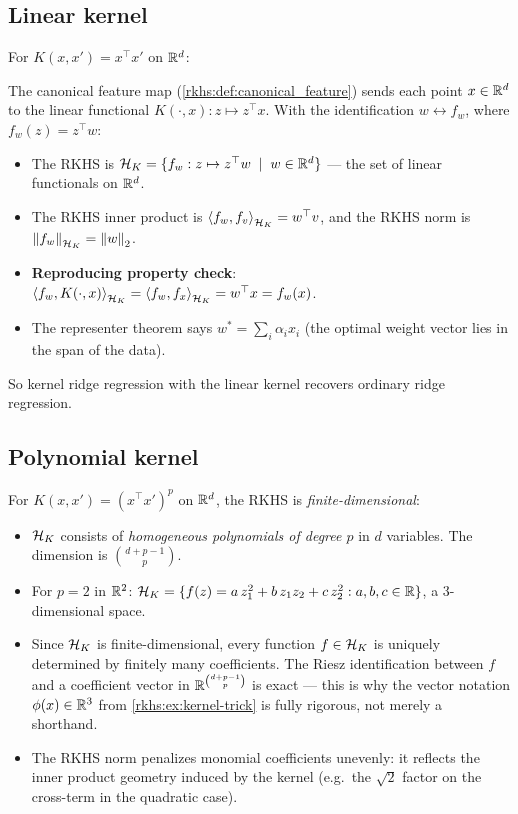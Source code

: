 \begin{notechapter}
\subsection{Linear kernel}

For $K(x,x') = x^\top x'$ on $\mathbb{R}^d$:

The canonical feature map
(\cref{rkhs:def:canonical_feature}) sends each
point $x \in \mathbb{R}^d$ to the linear functional
$K(\cdot, x): z \mapsto z^\top x$. With the
identification $w \leftrightarrow f_w$, where
$f_w(z) = z^\top w$:
\begin{itemize}
  \item The RKHS is
    $\mathcal{H}_K = \{f_w : z \mapsto z^\top w \;\mid\;
    w \in \mathbb{R}^d\}$ --- the set of linear functionals
    on $\mathbb{R}^d$.
  \item The RKHS inner product is
    $\left\langle f_w, f_v \right\rangle_{\mathcal{H}_K} = w^\top v$, and the
    RKHS norm is $\left\|f_w\right\|_{\mathcal{H}_K} = \left\|w\right\|_2$.
  \item \textbf{Reproducing property check}:
    $\left\langle f_w, K(\cdot,x) \right\rangle_{\mathcal{H}_K}
    = \left\langle f_w, f_x \right\rangle_{\mathcal{H}_K} = w^\top x
    = f_w(x)$.
  \item The representer theorem says
    $w^* = \sum_i \alpha_i x_i$ (the optimal weight
    vector lies in the span of the data).
\end{itemize}

So kernel ridge regression with the linear kernel recovers ordinary
ridge regression.

\subsection{Polynomial kernel}

For $K(x,x') = (x^\top x')^p$ on $\mathbb{R}^d$, the RKHS is
\emph{finite-dimensional}:
\begin{itemize}
  \item $\mathcal{H}_K$ consists of \emph{homogeneous polynomials
    of degree $p$} in $d$ variables. The dimension is
    $\binom{d+p-1}{p}$.
  \item For $p = 2$ in $\mathbb{R}^2$:
    $\mathcal{H}_K = \{f(z) = a\,z_1^2 + b\,z_1 z_2 + c\,z_2^2
    : a,b,c \in \mathbb{R}\}$, a $3$-dimensional space.
  \item Since $\mathcal{H}_K$ is finite-dimensional, every function
    $f \in \mathcal{H}_K$ is uniquely determined by finitely many
    coefficients. The Riesz identification between $f$
    and a coefficient vector in $\mathbb{R}^{\binom{d+p-1}{p}}$
    is exact --- this is why the vector notation
    $\phi(x) \in \mathbb{R}^3$ from \cref{rkhs:ex:kernel-trick} is fully rigorous,
    not merely a shorthand.
  \item The RKHS norm penalizes monomial coefficients
    unevenly: it reflects the inner product geometry
    induced by the kernel (e.g.\ the $\sqrt{2}$ factor
    on the cross-term in the quadratic case).
\end{itemize}


\end{notechapter}

